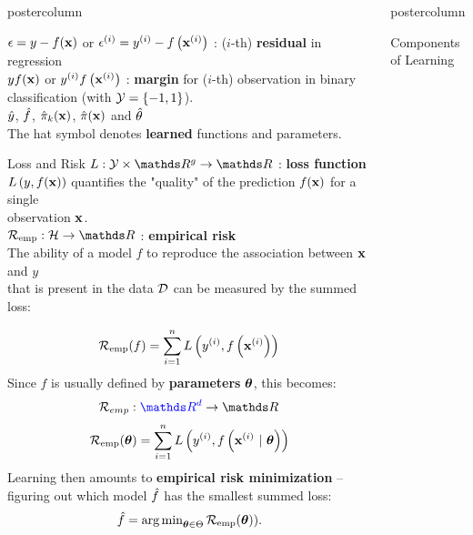 \documentclass{beamer}
\newlength{\columnheight} %
\begin{document}
\begin{frame}[fragile]{}
\begin{columns}
\begin{column}{.31\textwidth}
\begin{beamercolorbox}[center]{postercolumn}
\begin{minipage}{.98\textwidth}
{\begin{myblock}{}
$\epsilon = y - f(\mathbf{x})$ or $\epsilon^{(i)} = y^{(i)} - f\left(\mathbf{x}^{(i)}\right)$ : ($i$-th) \textbf{residual} in regression\\

$y f(\mathbf{x})$ or $y^{(i)} f\left(\mathbf{x}^{(i)}\right)$ : \textbf{margin} for ($i$-th) observation in binary \\ classification (with $\mathcal{Y} = \{-1, 1\}$). \\

$\hat{y}$, $\hat{f}$, $\hat \pi_{k}(\mathbf{x})$, $\hat \pi(\mathbf{x})$ and $\hat{\theta}$ \\
The hat symbol denotes \textbf{learned} functions and parameters.
\end{myblock}
\begin{myblock}{Loss and Risk}
  $L: \Yspace \times \R^g \to \R$ : \textbf{loss function} \\
 $L\left(y, f(\mathbf{x})\right)$ quantifies the "quality" of the prediction $f(\mathbf{x})$ for a single \\
 observation $\mathbf{x}$.  \\
  
  $\riske:  \Hspace \to \R $ : \textbf{empirical risk } \\
The ability of a model $f$ to reproduce the association between $\mathbf{x}$ and $y$ \\
that is present in the data $\mathcal{D}$ can be measured by the summed loss:
  
  $$\mathcal{R}_{\text{emp}}(f) = \sum\limits_{i=1}^n L\left(y^{(i)}, f\left(\mathbf{x}^{(i)}\right)\right)$$ 
Since $f$ is usually defined by \textbf{parameters} $\bm{\theta}$, this becomes:
  $$\risk_{emp} : \textcolor{blue}{\R^d} \to \R$$
  $$\mathcal{R}_{\text{emp}}(\bm{\theta})  =  \sum\limits_{i=1}^n L\left(y^{(i)}, f\left(\mathbf{x}^{(i)} ~|~ \bm{\theta}\right)\right) $$
  Learning then amounts to \textbf{empirical risk minimization} -- figuring out which model $\hat{f}$ has the smallest summed loss:$$\hat{f} = \operatorname{arg\,min}_{\bm{\theta} \in \Theta} \mathcal{R}_{\text{emp}}(\bm{\theta})).$$
\end{myblock}
				}
			\end{minipage}
		\end{beamercolorbox}
	\end{column}
	\begin{column}{.31\textwidth}
		\begin{beamercolorbox}[center]{postercolumn}
			\begin{minipage}{.98\textwidth}
				\parbox[t][\columnheight]{\textwidth}{
          \begin{myblock}{Components of Learning}
  

\end{myblock}}
\end{minipage}
\end{beamercolorbox}
\end{column}
\end{columns}
\end{frame}
\end{document}
